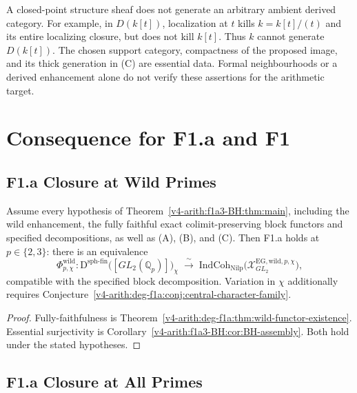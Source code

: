 \begin{remark}
\label{v4-arith:f1a3-BH:rem:wild-compact-generation-evidence}
A closed-point structure sheaf does not generate an arbitrary
ambient derived category. For example, in \(D(k[t])\), localization
at \(t\) kills \(k=k[t]/(t)\) and its entire localizing closure,
but does not kill \(k[t]\). Thus \(k\) cannot generate \(D(k[t])\).
The chosen support category, compactness of the proposed image, and
its thick generation in (C) are essential data. Formal neighbourhoods
or a derived enhancement alone do not verify these assertions for
the arithmetic target.
\end{remark}

\section{Consequence for F1.a and F1}
\label{v4-arith:f1a3-BH:consequence}

\subsection{F1.a Closure at Wild Primes}

\begin{theorem}
\label{v4-arith:f1a3-BH:thm:F1a-wild-conditional}
Assume every hypothesis of Theorem~\ref{v4-arith:f1a3-BH:thm:main},
including the wild enhancement, the fully faithful exact
colimit-preserving block functors and specified decompositions,
as well as (A), (B), and (C). Then F1.a holds at
\(p\in\{2,3\}\): there is an equivalence
\[
\Phi^{\mathrm{wild}}_{p,\chi}\colon
\mathrm{D}^{\mathrm{sph\text{-}fin}}\bigl([GL_{2}(\mathbb{Q}_{p})]\bigr)_{\chi}
\;\xrightarrow{\;\sim\;}\;
\mathrm{IndCoh}_{\mathrm{Nilp}}\bigl(\mathcal{X}^{\mathrm{EG,wild},p,\chi}_{GL_{2}}\bigr),
\]
compatible with the specified block decomposition. Variation in
\(\chi\) additionally requires
Conjecture~\ref{v4-arith:deg-f1a:conj:central-character-family}.
\end{theorem}

\begin{proof}
Fully-faithfulness is
Theorem~\ref{v4-arith:deg-f1a:thm:wild-functor-existence}. Essential
surjectivity is Corollary~\ref{v4-arith:f1a3-BH:cor:BH-assembly}. Both hold
under the stated hypotheses.
\end{proof}

\subsection{F1.a Closure at All Primes}

